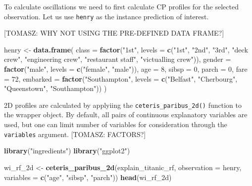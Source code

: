 \documentclass[12pt,]{krantz}
\newenvironment{Shaded}{\begin{snugshade}}{\end{snugshade}}
\newcommand{\DataTypeTok}[1]{\textcolor[rgb]{0.13,0.29,0.53}{#1}}
\newcommand{\DecValTok}[1]{\textcolor[rgb]{0.00,0.00,0.81}{#1}}
\newcommand{\KeywordTok}[1]{\textcolor[rgb]{0.13,0.29,0.53}{\textbf{#1}}}
\newcommand{\NormalTok}[1]{#1}
\newcommand{\StringTok}[1]{\textcolor[rgb]{0.31,0.60,0.02}{#1}}
\theoremstyle{definition}
\theoremstyle{definition}
\theoremstyle{definition}
\theoremstyle{remark}
\begin{document}
To calculate oscillations we need to first calculate CP profiles for the
selected observation. Let us use \texttt{henry} as the instance
prediction of interest.

{[}TOMASZ: WHY NOT USING THE PRE-DEFINED DATA FRAME?{]}

\begin{Shaded}
\begin{Highlighting}[]
\NormalTok{henry <-}\StringTok{ }\KeywordTok{data.frame}\NormalTok{(}
  \DataTypeTok{class =} \KeywordTok{factor}\NormalTok{(}\StringTok{"1st"}\NormalTok{, }\DataTypeTok{levels =} \KeywordTok{c}\NormalTok{(}\StringTok{"1st"}\NormalTok{, }\StringTok{"2nd"}\NormalTok{, }\StringTok{"3rd"}\NormalTok{, }\StringTok{"deck crew"}\NormalTok{, }\StringTok{"engineering crew"}\NormalTok{, }
                                  \StringTok{"restaurant staff"}\NormalTok{, }\StringTok{"victualling crew"}\NormalTok{)),}
  \DataTypeTok{gender =} \KeywordTok{factor}\NormalTok{(}\StringTok{"male"}\NormalTok{, }\DataTypeTok{levels =} \KeywordTok{c}\NormalTok{(}\StringTok{"female"}\NormalTok{, }\StringTok{"male"}\NormalTok{)),}
  \DataTypeTok{age =} \DecValTok{8}\NormalTok{,}
  \DataTypeTok{sibsp =} \DecValTok{0}\NormalTok{,}
  \DataTypeTok{parch =} \DecValTok{0}\NormalTok{,}
  \DataTypeTok{fare =} \DecValTok{72}\NormalTok{,}
  \DataTypeTok{embarked =} \KeywordTok{factor}\NormalTok{(}\StringTok{"Southampton"}\NormalTok{, }\DataTypeTok{levels =} \KeywordTok{c}\NormalTok{(}\StringTok{"Belfast"}\NormalTok{, }\StringTok{"Cherbourg"}\NormalTok{, }\StringTok{"Queenstown"}\NormalTok{, }\StringTok{"Southampton"}\NormalTok{))}
\NormalTok{)}
\end{Highlighting}
\end{Shaded}

2D profiles are calculated by applyiing the
\texttt{ceteris\_paribus\_2d()} function to the wrapper object. By
default, all pairs of continuous explanatory variables are used, but one
can limit number of variables for consideration through the
\texttt{variables} argument. {[}TOMASZ: FACTORS?{]}

\begin{Shaded}
\begin{Highlighting}[]
\KeywordTok{library}\NormalTok{(}\StringTok{"ingredients"}\NormalTok{)}
\KeywordTok{library}\NormalTok{(}\StringTok{"ggplot2"}\NormalTok{)}

\NormalTok{wi_rf_2d <-}\StringTok{ }\KeywordTok{ceteris_paribus_2d}\NormalTok{(explain_titanic_rf, }\DataTypeTok{observation =}\NormalTok{ henry, }\DataTypeTok{variables =} \KeywordTok{c}\NormalTok{(}\StringTok{"age"}\NormalTok{, }\StringTok{"sibsp"}\NormalTok{, }\StringTok{"parch"}\NormalTok{))}
\KeywordTok{head}\NormalTok{(wi_rf_2d)}
\end{Highlighting}
\end{Shaded}
\end{document}
